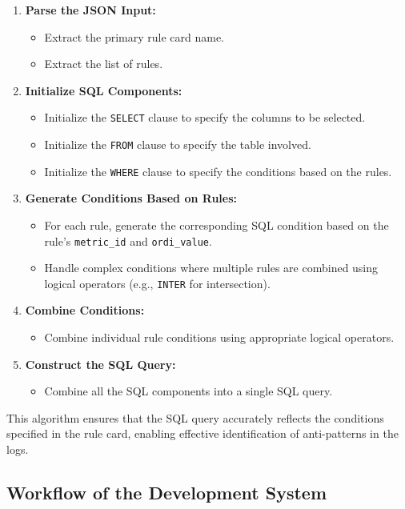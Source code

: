 \documentclass[12pt, times]{article}
\begin{document}
	\begin{enumerate}
		\item \textbf{Parse the JSON Input:}
		\begin{itemize}
			\item Extract the primary rule card name.
			\item Extract the list of rules.
		\end{itemize}
		\item \textbf{Initialize SQL Components:}
		\begin{itemize}
			\item Initialize the \texttt{SELECT} clause to specify the columns to be selected.
			\item Initialize the \texttt{FROM} clause to specify the table involved.
			\item Initialize the \texttt{WHERE} clause to specify the conditions based on the rules.
		\end{itemize}
		\item \textbf{Generate Conditions Based on Rules:}
		\begin{itemize}
			\item For each rule, generate the corresponding SQL condition based on the rule's \texttt{metric\_id} and \texttt{ordi\_value}.
			\item Handle complex conditions where multiple rules are combined using logical operators (e.g., \texttt{INTER} for intersection).
		\end{itemize}
		\item \textbf{Combine Conditions:}
		\begin{itemize}
			\item Combine individual rule conditions using appropriate logical operators.
		\end{itemize}
		\item \textbf{Construct the SQL Query:}
		\begin{itemize}
			\item Combine all the SQL components into a single SQL query.
		\end{itemize}
	\end{enumerate}
	
	\hspace*{5mm} This algorithm ensures that the SQL query accurately reflects the conditions specified in the rule card, enabling effective identification of anti-patterns in the logs.
	
	\subsection{Workflow of the Development System}
	
\end{document}
